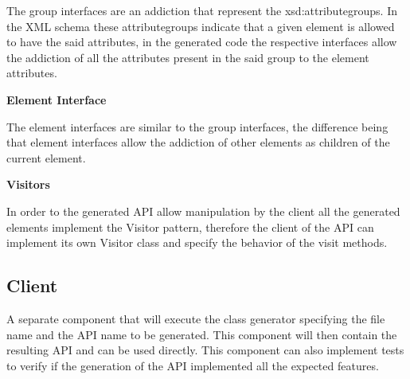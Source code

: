 The group interfaces are an addiction that represent the xsd:attributegroups. In the XML schema these attributegroups indicate that a given element is allowed to have the said attributes, in the generated code the respective interfaces allow the addiction of all the attributes present in the said group to the element attributes.

\textbf{Element Interface}

The element interfaces are similar to the group interfaces, the difference being that element interfaces allow the addiction of other elements as children of the current element. 

\textbf{Visitors}

In order to the generated API allow manipulation by the client all the generated elements implement the Visitor pattern, therefore the client of the API can implement its own Visitor class and specify the behavior of the visit methods.

\subsection{Client}

A separate component that will execute the class generator specifying the file name and the API name to be generated. This component will then contain the resulting API and can be used directly. This component can also implement tests to verify if the generation of the API implemented all the expected features.